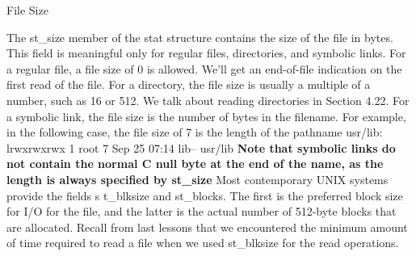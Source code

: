 \documentclass{beamer}
\begin{document}
\begin{frame}[t]{File Size}

The st\_size member of the stat structure contains the size of the file in bytes. This
field is meaningful only for regular files, directories, and symbolic links.              
For a regular file, a file size of 0 is allowed. We’ll get an end-of-file indication on the
first read of the file. For a directory, the file size is usually a multiple of a number, such
as 16 or 512. We talk about reading directories in Section 4.22.
For a symbolic link, the file size is the number of bytes in the filename. For
example, in the following case, the file size of 7 is the length of the pathname usr/lib:
lrwxrwxrwx 1 root 7 Sep 25 07:14 lib\--- usr/lib
\textbf{Note that symbolic links do not contain the normal C null byte at the end of the name,
	as the length is always specified by st\_size}
Most contemporary UNIX systems provide the fields s
t\_blksize and
st\_blocks. The first is the preferred block size for I/O for the file, and the latter is the
actual number of 512-byte blocks that are allocated. Recall from last lessons that we
encountered the minimum amount of time required to read a file when we used
st\_blksize for the read operations.



\end{frame}
\end{document}
